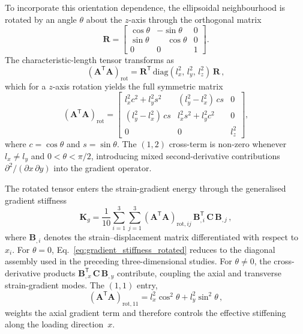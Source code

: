 \documentclass[final,3p,times,fleqn]{elsarticle}
\begin{document}
To incorporate this orientation dependence, the ellipsoidal
neighbourhood is rotated by an angle $\theta$ about the $z$-axis through
the orthogonal matrix
%
\begin{equation}
\mathbf{R} =
\begin{bmatrix}
\cos\theta & -\sin\theta & 0 \\
\sin\theta & \phantom{-}\cos\theta & 0 \\
0          & 0                      & 1
\end{bmatrix}.
\label{eq:rotation_matrix}
\end{equation}
%
The characteristic-length tensor transforms as
%
\begin{equation}
(\mathbf{A}^{\mathsf{T}}\mathbf{A})_{\mathrm{rot}}
= \mathbf{R}^{\mathsf{T}}\,
\mathrm{diag}(l_{x}^{2},\, l_{y}^{2},\, l_{z}^{2})\,
\mathbf{R}\,,
\label{eq:AAT_rot}
\end{equation}
%
which for a $z$-axis rotation yields the full symmetric matrix
%
\begin{equation}
(\mathbf{A}^{\mathsf{T}}\mathbf{A})_{\mathrm{rot}}
= \begin{bmatrix}
l_{x}^{2}c^{2} + l_{y}^{2}s^{2}
  & (l_{y}^{2}-l_{x}^{2})\,cs & 0 \\[4pt]
(l_{y}^{2}-l_{x}^{2})\,cs
  & l_{x}^{2}s^{2} + l_{y}^{2}c^{2} & 0 \\[4pt]
0 & 0 & l_{z}^{2}
\end{bmatrix},
\label{eq:AAT_rot_explicit}
\end{equation}
%
where $c = \cos\theta$ and $s = \sin\theta$.
The $(1,2)$ cross-term is non-zero whenever $l_{x}\neq l_{y}$ and
$0 < \theta < \pi/2$, introducing mixed second-derivative contributions
$\partial^{2}/(\partial x\,\partial y)$ into the gradient operator.

The rotated tensor enters the strain-gradient energy through the
generalised gradient stiffness
%
\begin{equation}
\mathbf{K}_{g}
= \frac{1}{10}\sum_{i=1}^{3}\sum_{j=1}^{3}
(\mathbf{A}^{\mathsf{T}}\mathbf{A})_{\mathrm{rot},ij}\,
\mathbf{B}_{,i}^{\mathsf{T}}\,\mathbf{C}\,\mathbf{B}_{,j}\,,
\label{eq:gradient_stiffness_rotated}
\end{equation}
%
where $\mathbf{B}_{,i}$ denotes the strain--displacement matrix
differentiated with respect to $x_{i}$.
For $\theta = 0$, Eq.~\eqref{eq:gradient_stiffness_rotated} reduces to
the diagonal assembly used in the preceding three-dimensional studies.
For $\theta\neq 0$, the cross-derivative products
$\mathbf{B}_{,x}^{\mathsf{T}}\,\mathbf{C}\,\mathbf{B}_{,y}$ contribute,
coupling the axial and transverse strain-gradient modes.
The $(1,1)$ entry,
%
\begin{equation}
(\mathbf{A}^{\mathsf{T}}\mathbf{A})_{\mathrm{rot},11}
= l_{x}^{2}\cos^{2}\theta + l_{y}^{2}\sin^{2}\theta\,,
\label{eq:AAT_rot_11}
\end{equation}
%
weights the axial gradient term and therefore controls the effective
stiffening along the loading direction~$x$.
\end{document}
